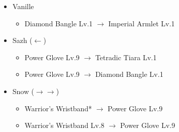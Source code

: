 \begin{menu}
\begin{itemize}
\begin{itemize}
				{\paradigmline[4]{\syn}{\sab}{\com}}%
				{\paradigmline{\rav}{\med}{(\sen)}}%
				{\paradigmline{\rav}{\rav}{\rav}}%
		\end{itemize}
		\equip
		\begin{itemize}
			\item Vanille
				\begin{itemize}
					\item Diamond Bangle Lv.1 $\rightarrow$ Imperial Armlet Lv.1
				\end{itemize}
			\item Sazh ($\leftarrow$)
				\begin{itemize}
					\item Power Glove Lv.9 $\rightarrow$ Tetradic Tiara Lv.1
					\item Power Glove Lv.9 $\rightarrow$ Diamond Bangle Lv.1
				\end{itemize}
			\item Snow ($\rightarrow\rightarrow$)
				\begin{itemize}
					\item Warrior's Wristband* $\rightarrow$ Power Glove Lv.9
					\item Warrior's Wristband Lv.8 $\rightarrow$ Power Glove Lv.9
				\end{itemize}
		\end{itemize}
	\end{itemize}	
\end{menu}
	
\renewcommand{\second}{[2] Overcaution (\sen/\sab/\sen)}
\renewcommand{\third}{[3] Consolidation (\sen/\med/\sen)}
\renewcommand{\fifth}{[5] Entourage (\rav/\med/\sen)}

